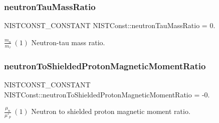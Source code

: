 \subsubsection{\texorpdfstring{neutron\+Tau\+Mass\+Ratio}{neutronTauMassRatio}}
{\footnotesize\ttfamily N\+I\+S\+T\+C\+O\+N\+S\+T\+\_\+\+C\+O\+N\+S\+T\+A\+NT N\+I\+S\+T\+Const\+::neutron\+Tau\+Mass\+Ratio = 0.}

$\frac{m_n}{m_\tau} \ (1)$ Neutron-\/tau mass ratio. \mbox{\label{group___n_i_s_t_const-_neutron_gade519a41d92b6d1844a8ff1a24d5438f}} 
\subsubsection{\texorpdfstring{neutron\+To\+Shielded\+Proton\+Magnetic\+Moment\+Ratio}{neutronToShieldedProtonMagneticMomentRatio}}
{\footnotesize\ttfamily N\+I\+S\+T\+C\+O\+N\+S\+T\+\_\+\+C\+O\+N\+S\+T\+A\+NT N\+I\+S\+T\+Const\+::neutron\+To\+Shielded\+Proton\+Magnetic\+Moment\+Ratio = -\/0.}

$\frac{\mu_n}{\mu'_p} \ (1)$ Neutron to shielded proton magnetic moment ratio. 